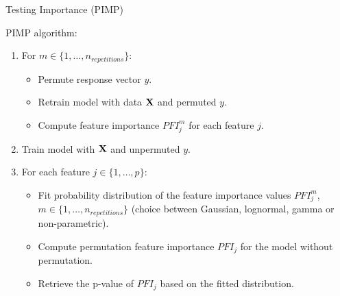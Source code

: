 \documentclass[11pt,compress,t,notes=noshow, aspectratio=169, xcolor=table]{beamer}
\begin{document}
\begin{vbframe}{Testing Importance (PIMP)}

PIMP algorithm:
\begin{enumerate}
	\item For $m \in \{1, \ldots, n_{repetitions}\}$:
		\begin{itemize}
			\item Permute response vector $y$.
			\item Retrain model with data $\Xmat$ and permuted $y$.
			\item Compute feature importance $PFI_j^m$ for each feature $j$.
		\end{itemize}
	\item Train model with $\Xmat$ and unpermuted $y$.
	\item For each feature $j \in \{1,\ldots,p\}$:
		\begin{itemize}
			\item Fit probability distribution of the feature importance values $PFI_j^m$, $m \in \{1, \ldots, n_{repetitions}\}$ (choice between Gaussian, lognormal, gamma or non-parametric).
			\item Compute permutation feature importance $PFI_j$ for the model without permutation.
			\item Retrieve the p-value of $PFI_j$ based on the fitted distribution.
		\end{itemize}
\end{enumerate}
\end{vbframe}
\end{document}

